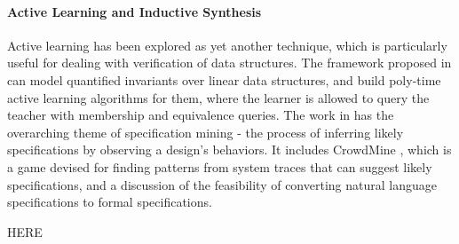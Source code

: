 \paragraph{Active Learning and Inductive Synthesis}
Active learning has been explored as yet another technique, which is particularly useful for
dealing with verification of data structures. The framework proposed in \cite{garg13}
can model quantified invariants over linear data structures, and build poly-time active
learning algorithms for them, where the learner is allowed to query the teacher with
membership and equivalence queries. The work in \cite{wenchao-thesis} has the
overarching theme of specification mining - the process of inferring likely
specifications by observing a design's behaviors. It includes
CrowdMine \cite{wenchao2012}, which is a game devised for finding patterns from system
traces that can suggest likely specifications, and a discussion of the feasibility
of converting natural language specifications to formal specifications.

HERE
\cite{jha-arxiv15}
\cite{sagiv2016}
\cite{padhi2016}






